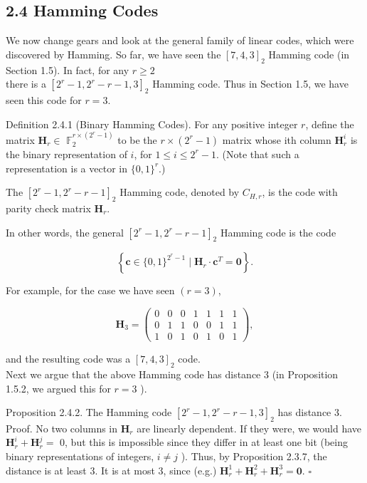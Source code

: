 \documentclass[10pt]{article}
\begin{document}
\subsection*{2.4 Hamming Codes}
We now change gears and look at the general family of linear codes, which were discovered by Hamming. So far, we have seen the $[7,4,3]_{2}$ Hamming code (in Section 1.5). In fact, for any $r \geq 2$\\
there is a $\left[2^{r}-1,2^{r}-r-1,3\right]_{2}$ Hamming code. Thus in Section 1.5, we have seen this code for $r=3$.

Definition 2.4.1 (Binary Hamming Codes). For any positive integer $r$, define the matrix $\mathbf{H}_{r} \in$ $\mathbb{F}_{2}^{r \times\left(2^{r}-1\right)}$ to be the $r \times\left(2^{r}-1\right)$ matrix whose ith column $\mathbf{H}_{r}^{i}$ is the binary representation of $i$, for $1 \leq i \leq 2^{r}-1$. (Note that such a representation is a vector in $\{0,1\}^{r}$.)

The $\left[2^{r}-1,2^{r}-r-1\right]_{2}$ Hamming code, denoted by $C_{H, r}$, is the code with parity check matrix $\mathbf{H}_{r}$.

In other words, the general $\left[2^{r}-1,2^{r}-r-1\right]_{2}$ Hamming code is the code

$$
\left\{\mathbf{c} \in\{0,1\}^{2^{r}-1} \mid \mathbf{H}_{r} \cdot \mathbf{c}^{T}=\mathbf{0}\right\} .
$$

For example, for the case we have seen $(r=3)$,

$$
\mathbf{H}_{3}=\left(\begin{array}{lllllll}
0 & 0 & 0 & 1 & 1 & 1 & 1 \\
0 & 1 & 1 & 0 & 0 & 1 & 1 \\
1 & 0 & 1 & 0 & 1 & 0 & 1
\end{array}\right),
$$

and the resulting code was a $[7,4,3]_{2}$ code.\\
Next we argue that the above Hamming code has distance 3 (in Proposition 1.5.2, we argued this for $r=3$ ).

Proposition 2.4.2. The Hamming code $\left[2^{r}-1,2^{r}-r-1,3\right]_{2}$ has distance 3.\\
Proof. No two columns in $\mathbf{H}_{r}$ are linearly dependent. If they were, we would have $\mathbf{H}_{r}^{i}+\mathbf{H}_{r}^{j}=$ 0, but this is impossible since they differ in at least one bit (being binary representations of integers, $i \neq j$ ). Thus, by Proposition 2.3.7, the distance is at least 3. It is at most 3, since (e.g.) $\mathbf{H}_{r}^{1}+\mathbf{H}_{r}^{2}+\mathbf{H}_{r}^{3}=\mathbf{0}$. \(\square\)
\end{document}
